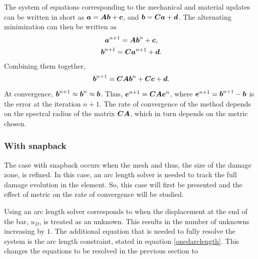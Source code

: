 \documentclass[10pt]{elsarticle}
\begin{document}
The system of equations corresponding to the mechanical and material updates can be written in short as $\mbox{\boldmath $a$} = \mbox{\boldmath $A$} \mbox{\boldmath $b$} + \mbox{\boldmath $c$}$, and $\mbox{\boldmath $b$} = \mbox{\boldmath $C$} \mbox{\boldmath $a$} + \mbox{\boldmath $d$}$. The alternating minimization can then be written as
\begin{gather}
	\mbox{\boldmath $a$}^{n+1} = \mbox{\boldmath $A$} \mbox{\boldmath $b$}^{n} + \mbox{\boldmath $c$}, \\
	\mbox{\boldmath $b$}^{n+1} = \mbox{\boldmath $C$} \mbox{\boldmath $a$}^{n+1} + \mbox{\boldmath $d$}.
\end{gather}
Combining them together, 
\begin{equation}
	\mbox{\boldmath $b$}^{n+1} = \mbox{\boldmath $C$} \mbox{\boldmath $A$} \mbox{\boldmath $b$}^{n} +\mbox{\boldmath $C$} \mbox{\boldmath $c$} + \mbox{\boldmath $d$}. \label{combined_equn}
\end{equation}
At convergence, $\mbox{\boldmath $b$}^{n+1} \approx \mbox{\boldmath $b$}^{n} \approx \mbox{\boldmath $b$}$. Thus, $\mbox{\boldmath $e$}^{n+1} = \mbox{\boldmath $C$} \mbox{\boldmath $A$} \mbox{\boldmath $e$}^{n}$, where $\mbox{\boldmath $e$}^{n+1} = \mbox{\boldmath $b$}^{n+1} - \mbox{\boldmath $b$}$ is the error at the iteration $n+1$. The rate of convergence of the method depends on the spectral radius of the matrix $\mbox{\boldmath $C$} \mbox{\boldmath $A$}$, which in turn depends on the metric chosen. 

\subsubsection*{With snapback}
The case with snapback occurs when the mesh and thus, the size of the damage zone, is refined. In this case, an arc length solver is needed to track the full damage evolution in the element. So, this case will first be presented and the effect of metric on the rate of convergence will be studied.

Using an arc length solver corresponds to when the displacement at the end of the bar, $u_D$, is treated as an unknown. This results in the number of unknowns increasing by $1$. The additional equation that is needed to fully resolve the system is the arc length constraint, stated in equation \ref{onedarclength}. This changes the equations to be resolved in the previous section to 
\end{document}
